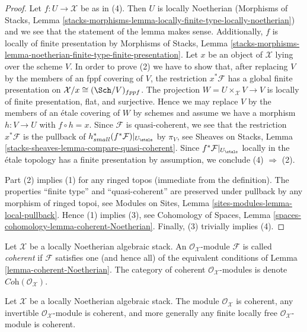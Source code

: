 \begin{proof}
Let $f : U \to \mathcal{X}$ be as in (4).
Then $U$ is locally Noetherian (Morphisms of Stacks, Lemma
\ref{stacks-morphisms-lemma-locally-finite-type-locally-noetherian})
and we see that the statement of the lemma makes sense. Additionally,
$f$ is locally of finite presentation by Morphisms of Stacks, Lemma
\ref{stacks-morphisms-lemma-noetherian-finite-type-finite-presentation}.
Let $x$ be an object of $\mathcal{X}$ lying over the scheme $V$.
In order to prove (2) we have to show that, after replacing $V$
by the members of an fppf covering of $V$, the restriction $x^*\mathcal{F}$
has a global finite presentation on $\mathcal{X}/x \cong (\Sch/V)_{fppf}$.
The projection $W = U \times_\mathcal{X} V \to V$ is
locally of finite presentation, flat, and surjective.
Hence we may replace $V$ by the members of an \'etale covering of $W$
by schemes and assume we have a morphism $h : V \to U$ with $f \circ h = x$.
Since $\mathcal{F}$ is quasi-coherent, we see that
the restriction $x^*\mathcal{F}$
is the pullback of $h_{small}^*(f^*\mathcal{F})|_{U_\etale}$
by $\pi_V$, see Sheaves on Stacks, Lemma
\ref{stacks-sheaves-lemma-compare-quasi-coherent}.
Since $f^*\mathcal{F}|_{U_\etale}$ locally in the
\'etale topology has a finite presentation by assumption, we conclude
(4) $\Rightarrow$ (2).

\medskip\noindent
Part (2) implies (1) for any ringed topos (immediate from the definition).
The properties ``finite type'' and ``quasi-coherent''
are preserved under pullback by any morphism of ringed topoi, see
Modules on Sites, Lemma \ref{sites-modules-lemma-local-pullback}.
Hence (1) implies (3), see Cohomology of Spaces, Lemma
\ref{spaces-cohomology-lemma-coherent-Noetherian}.
Finally, (3) trivially implies (4).
\end{proof}

\begin{definition}
\label{definition-coherent}
Let $\mathcal{X}$ be a locally Noetherian algebraic stack.
An $\mathcal{O}_\mathcal{X}$-module $\mathcal{F}$ is called {\it coherent}
if $\mathcal{F}$ satisfies one (and hence all) of the equivalent
conditions of Lemma \ref{lemma-coherent-Noetherian}.
The category of coherent $\mathcal{O}_\mathcal{X}$-modules is
denote $\textit{Coh}(\mathcal{O}_\mathcal{X})$.
\end{definition}

\begin{lemma}
\label{lemma-elementary-coherent}
Let $\mathcal{X}$ be a locally Noetherian algebraic stack.
The module $\mathcal{O}_\mathcal{X}$ is coherent, any invertible
$\mathcal{O}_\mathcal{X}$-module is coherent, and more generally any
finite locally free $\mathcal{O}_\mathcal{X}$-module is coherent.
\end{lemma}

